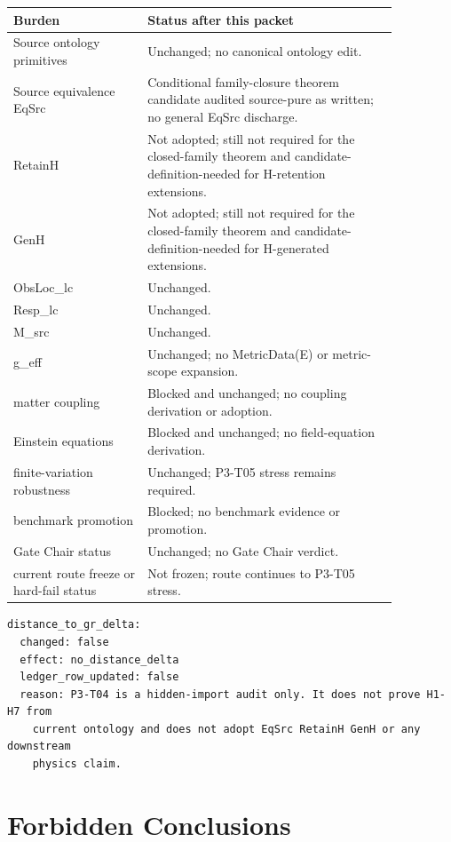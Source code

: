 \documentclass[11pt]{article}
\begin{document}
\begin{longtable}{p{0.30\linewidth}p{0.56\linewidth}}
\toprule
Burden & Status after this packet \\
\midrule
Source ontology primitives & Unchanged; no canonical ontology edit. \\
Source equivalence EqSrc & Conditional family-closure theorem candidate audited source-pure as written; no general EqSrc discharge. \\
RetainH & Not adopted; still not required for the closed-family theorem and candidate-definition-needed for H-retention extensions. \\
GenH & Not adopted; still not required for the closed-family theorem and candidate-definition-needed for H-generated extensions. \\
ObsLoc\_lc & Unchanged. \\
Resp\_lc & Unchanged. \\
M\_src & Unchanged. \\
g\_eff & Unchanged; no MetricData(E) or metric-scope expansion. \\
matter coupling & Blocked and unchanged; no coupling derivation or adoption. \\
Einstein equations & Blocked and unchanged; no field-equation derivation. \\
finite-variation robustness & Unchanged; P3-T05 stress remains required. \\
benchmark promotion & Blocked; no benchmark evidence or promotion. \\
Gate Chair status & Unchanged; no Gate Chair verdict. \\
current route freeze or hard-fail status & Not frozen; route continues to P3-T05 stress. \\
\bottomrule
\end{longtable}

\begin{verbatim}
distance_to_gr_delta:
  changed: false
  effect: no_distance_delta
  ledger_row_updated: false
  reason: P3-T04 is a hidden-import audit only. It does not prove H1-H7 from
    current ontology and does not adopt EqSrc RetainH GenH or any downstream
    physics claim.
\end{verbatim}

\section{Forbidden Conclusions}
\end{document}
